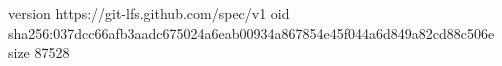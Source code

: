 version https://git-lfs.github.com/spec/v1
oid sha256:037dcc66afb3aadc675024a6eab00934a867854e45f044a6d849a82cd88c506e
size 87528
